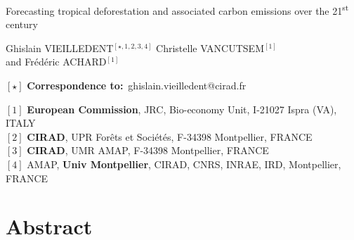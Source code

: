 \documentclass[
  12pt,
]{article}
\author{}
\date{\vspace{-2.5em}}
\begin{document}
\renewcommand{\bibsection}{}  %

\begin{center}
  \LARGE{Forecasting tropical deforestation and associated carbon emissions over the 21\textsuperscript{st} century}
\end{center}

\vspace{1cm}

\begin{center}
  \large{
  Ghislain VIEILLEDENT$^{[\star, 1, 2, 3, 4]}$ \hspace{0.5cm} Christelle VANCUTSEM$^{[1]}$\\
  \vspace{0.5cm}
  and \hspace{0.5cm} Frédéric ACHARD$^{[1]}$
  }
\end{center}

\vspace{0.5cm}

\begin{center}
  $[\star]$ \textbf{Correspondence to:}~ghislain.vieilledent@cirad.fr\\
\end{center}

\vspace{0.5cm}

{\small
  \begin{flushleft}
    $[1]$ \textbf{European Commission}, JRC, Bio-economy Unit, I-21027 Ispra (VA), ITALY\\
    $[2]$ \textbf{CIRAD}, UPR Forêts et Sociétés, F-34398 Montpellier, FRANCE\\
    $[3]$ \textbf{CIRAD}, UMR AMAP, F-34398 Montpellier, FRANCE\\
    $[4]$ AMAP, \textbf{Univ Montpellier}, CIRAD, CNRS, INRAE, IRD, Montpellier, FRANCE\\
  \end{flushleft}}


\linenumbers

\hypertarget{abstract}{%
\section*{Abstract}\label{abstract}}
\end{document}
